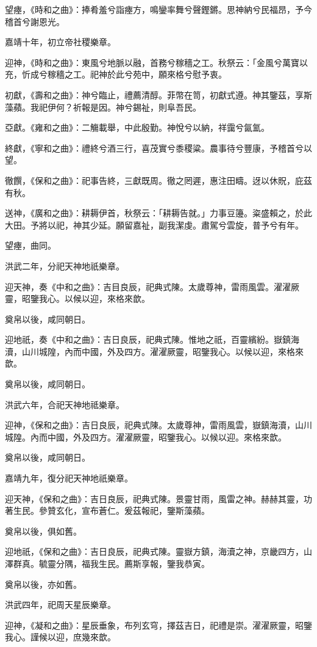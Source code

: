 望瘞，《時和之曲》：捧肴羞兮詣瘞方，鳴鑾率舞兮聲鏗鏘。思神納兮民福昂，予今稽首兮謝恩光。

嘉靖十年，初立帝社稷樂章。

迎神，《時和之曲》：東風兮地脈以融，首務兮稼穡之工。秋祭云：「金風兮萬寶以充，忻成兮稼穡之工。祀神於此兮苑中，願來格兮慰予衷。

初獻，《壽和之曲》：神兮臨止，禮薦清醇。菲幣在笥，初獻式遵。神其鑒茲，享斯藻蘋。我祀伊何？祈報是因。神兮錫祉，則阜吾民。

亞獻。《雍和之曲》：二觴載舉，中此殷勤。神悅兮以納，祥靄兮氤氳。

終獻，《寧和之曲》：禮終兮酒三行，喜茂實兮黍稷粱。農事待兮豐康，予稽首兮以望。

徹饌，《保和之曲》：祀事告終，三獻既周。徹之罔遲，惠注田疇。迓以休貺，庇茲有秋。

送神，《廣和之曲》：耕耨伊首，秋祭云：「耕耨告就。」力事豆籩。粢盛賴之，於此大田。予將以祀，神其少延。願留嘉祉，副我潔虔。肅駕兮雲旋，普予兮有年。

望瘞，曲同。

洪武二年，分祀天神地祇樂章。

迎天神，奏《中和之曲》：吉目良辰，祀典式陳。太歲尊神，雷雨風雲。濯濯厥靈，昭鑒我心。以候以迎，來格來歆。

奠帛以後，咸同朝日。

迎地祇，奏《中和之曲》：吉日良辰，祀典式陳。惟地之祇，百靈繽紛。嶽鎮海瀆，山川城隍，內而中國，外及四方。濯濯厥靈，昭鑒我心。以候以迎，來格來歆。

奠帛以後，咸同朝日。

洪武六年，合祀天神地祗樂章。

迎神，《保和之曲》：吉日良辰，祀典式陳。太歲尊神，雷雨風雲，嶽鎮海瀆，山川城隍。內而中國，外及四方。濯濯厥靈，昭鑒我心。以候以迎。來格來歆。

奠帛以後，咸同朝日。

嘉靖九年，復分祀天神地祇樂章。

迎天神，《保和之曲》：吉日良辰，祀典式陳。景靈甘雨，風雷之神。赫赫其靈，功著生民。參贊玄化，宣布蒼仁。爰茲報祀，鑒斯藻蘋。

奠帛以後，俱如舊。

迎地祇，《保和之曲》：吉日良辰，祀典式陳。靈嶽方鎮，海瀆之神，京畿四方，山澤群真。毓靈分隅，福我生民。薦斯享報，鑒我恭寅。

奠帛以後，亦如舊。

洪武四年，祀周天星辰樂章。

迎神，《凝和之曲》：星辰垂象，布列玄穹，擇茲吉日，祀禮是崇。濯濯厥靈，昭鑒我心。謹候以迎，庶幾來歆。

